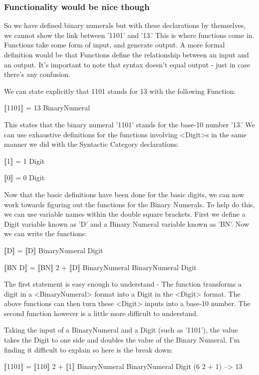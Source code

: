 \documentclass[12pt]{article}
\begin{document}
\subsubsection{Functionality would be nice though}
\label{sec-2-3-4}
So we have defined binary numerals but with these declarations by themselves,
we cannot show the link between '1101' and '13.'  This is where functions come
in.  Functions take some form of input, and generate output.  A more formal
definition would be that Functions define the relationship between an input and
an output.  It's important to note that syntax doesn't equal output - just in
case there's any confusion.

We can state explicitly that 1101 stands for 13 with the following Function:

⟦1101⟧              = 13
      BinaryNumeral

This states that the binary numeral '1101' stands for the base-10 number '13.'
We can use exhaustive definitions for the functions involving <Digit>s in the
same manner we did with the Syntactic Category declarations:

⟦1⟧      = 1
   Digit

⟦0⟧      = 0
   Digit

Now that the basic definitions have been done for the basic digits, we can now
work towards figuring out the functions for the Binary Numerals.  To help do
this, we can use variable names within the double square brackets.  First we
define a Digit variable known as 'D' and a Binary Numeral variable known as
'BN'.  Now we can write the functions:

⟦D⟧              = ⟦D⟧
   BinaryNumeral     Digit

⟦BN D⟧              = ⟦BN⟧             \texttimes{} 2 + ⟦D⟧
      BinaryNumeral      BinaryNumeral         Digit

The first statement is easy enough to understand - The function transforms a
digit in a <BinaryNumeral> format into a Digit in the <Digit> format.  The
above functions can then turn these <Digit> inputs into a base-10 number.  The
second function however is a little more difficult to understand.

Taking the input of a BinaryNumeral and a Digit (such as '1101'), the value
takes the Digit to one side and doubles the value of the Binary Numeral.  I'm
finding it difficult to explain so here is the break down:

⟦1101⟧              = ⟦110⟧             \texttimes{} 2 + ⟦1⟧
      BinaryNumeral       BinaryNumeral         Digit (6 \texttimes{} 2 + 1) --> 13
\end{document}
